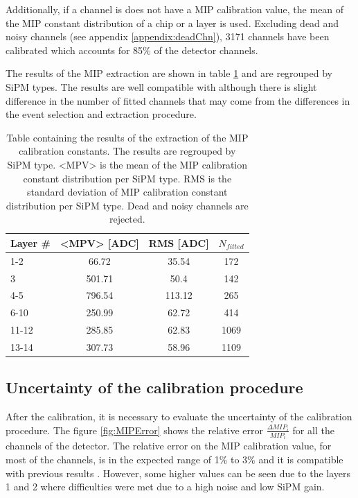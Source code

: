 Additionally, if a channel is does not have a MIP calibration value, the mean of the MIP constant distribution of a chip or a layer is used. Excluding dead and noisy channels (see appendix \ref{appendix:deadChn}), 3171 channels have been calibrated which accounts for 85\% of the detector channels.

The results of the MIP extraction are shown in table \ref{table:MIPAHCAL} and are regrouped by SiPM types. The results are well compatible with \cite{SarahMaster} although there is slight difference in the number of fitted channels that may come from the differences in the event selection and extraction procedure.

\begin{table}[htb!]
	\centering
	\caption{Table containing the results of the extraction of the MIP calibration constants. The results are regrouped by SiPM type. <MPV> is the mean of the MIP calibration constant distribution per SiPM type. RMS is the standard deviation of MIP calibration constant distribution per SiPM type. Dead and noisy channels are rejected.}
	\label{table:MIPAHCAL}
	\begin{tabular}{@{} lccc @{}}
		\toprule
		Layer \# & <MPV> [ADC] & RMS [ADC] & $N_{fitted}$\\
		\midrule
		1-2 & 66.72 & 35.54 & 172\\
		3 & 501.71 & 50.4 & 142\\
		4-5 & 796.54 & 113.12 & 265\\
		6-10 & 250.99 & 62.72 & 414\\
		11-12 & 285.85 & 62.83 & 1069\\
		13-14 & 307.73 & 58.96 & 1109\\
		\bottomrule
	\end{tabular}
\end{table}

\subsection{Uncertainty of the calibration procedure}

After the calibration, it is necessary to evaluate the uncertainty of the calibration procedure. The figure \ref{fig:MIPError} shows the relative error $\frac{\Delta MIP_i}{MIP_i}$ for all the channels of the detector. The relative error on the MIP calibration value, for most of the channels, is in the expected range of 1\% to 3\% and it is compatible with previous results \cite{SarahMaster}. However, some higher values can be seen due to the layers 1 and 2 where difficulties were met due to a high noise and low SiPM gain.

